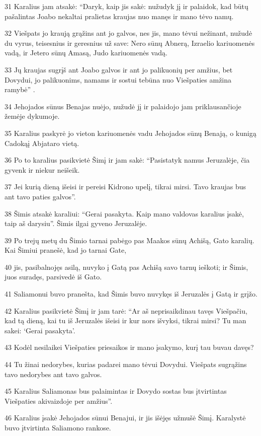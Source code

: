 \par 31 Karalius jam atsakė: “Daryk, kaip jis sakė: nužudyk jį ir palaidok, kad būtų pašalintas Joabo nekaltai pralietas kraujas nuo manęs ir mano tėvo namų. 
\par 32 Viešpats jo kraują grąžins ant jo galvos, nes jis, mano tėvui nežinant, nužudė du vyrus, teisesnius ir geresnius už save: Nero sūnų Abnerą, Izraelio kariuomenės vadą, ir Jetero sūnų Amasą, Judo kariuomenės vadą. 
\par 33 Jų kraujas sugrįš ant Joabo galvos ir ant jo palikuonių per amžius, bet Dovydui, jo palikuonims, namams ir sostui tebūna nuo Viešpaties amžina ramybė” . 
\par 34 Jehojados sūnus Benajas nuėjo, nužudė jį ir palaidojo jam priklausančioje žemėje dykumoje. 
\par 35 Karalius paskyrė jo vieton kariuomenės vadu Jehojados sūnų Benają, o kunigą Cadoką­į Abjataro vietą. 
\par 36 Po to karalius pasikvietė Šimį ir jam sakė: “Pasistatyk namus Jeruzalėje, čia gyvenk ir niekur neišeik. 
\par 37 Jei kurią dieną išeisi ir pereisi Kidrono upelį, tikrai mirsi. Tavo kraujas bus ant tavo paties galvos”. 
\par 38 Šimis atsakė karaliui: “Gerai pasakyta. Kaip mano valdovas karalius įsakė, taip aš darysiu”. Šimis ilgai gyveno Jeruzalėje. 
\par 39 Po trejų metų du Šimio tarnai pabėgo pas Maakos sūnų Achišą, Gato karalių. Kai Šimiui pranešė, kad jo tarnai Gate, 
\par 40 jis, pasibalnojęs asilą, nuvyko į Gatą pas Achišą savo tarnų ieškoti; ir Šimis, juos suradęs, parsivedė iš Gato. 
\par 41 Saliamonui buvo pranešta, kad Šimis buvo nuvykęs iš Jeruzalės į Gatą ir grįžo. 
\par 42 Karalius pasikvietė Šimį ir jam tarė: “Ar aš neprisaikdinau tavęs Viešpačiu, kad tą dieną, kai tu iš Jeruzalės išeisi ir kur nors išvyksi, tikrai mirsi? Tu man sakei: ‘Gerai pasakyta’. 
\par 43 Kodėl nesilaikei Viešpaties priesaikos ir mano įsakymo, kurį tau buvau davęs? 
\par 44 Tu žinai nedorybes, kurias padarei mano tėvui Dovydui. Viešpats sugrąžins tavo nedorybes ant tavo galvos. 
\par 45 Karalius Saliamonas bus palaimintas ir Dovydo sostas bus įtvirtintas Viešpaties akivaizdoje per amžius”. 
\par 46 Karalius įsakė Jehojados sūnui Benajui, ir jis išėjęs užmušė Šimį. Karalystė buvo įtvirtinta Saliamono rankose.



